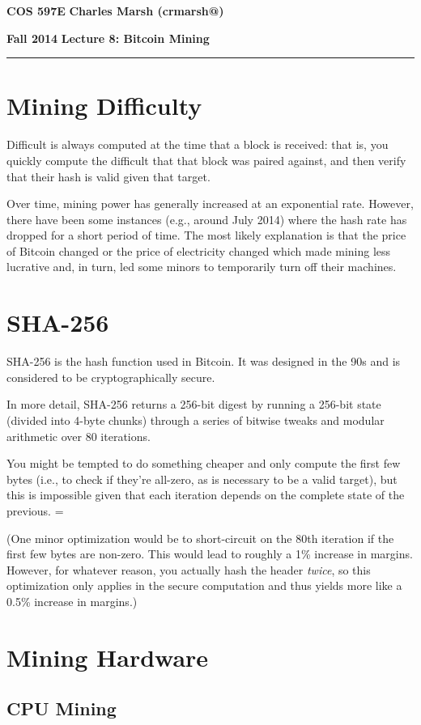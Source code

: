 \documentclass[12pt]{article}
\makeatletter
\newcommand{\myheader}[4]
{\vspace*{-0.5in}
\noindent
{#1} \hfill {#3}

\noindent
{#2} \hfill {#4}

\noindent
\rule[8pt]{\textwidth}{1pt}

\vspace{1ex} 
}  %
\newcommand{\myalgsheader}[0]
{\myheader
{ {\bf{COS 597E}} }
{ {\bf{Fall 2014}} }
{ {\bf{Charles Marsh (crmarsh@)}} }
{ {\bf{Lecture 8: Bitcoin Mining}} }
}
\makeatother
\begin{document}
\myalgsheader

\pagestyle{plain}

\section*{Mining Difficulty}

Difficult is always computed at the time that a block is received: that is, you quickly compute the difficult that that block was paired against, and then verify that their hash is valid given that target.

Over time, mining power has generally increased at an exponential rate. However, there have been some instances (e.g., around July 2014) where the hash rate has dropped for a short period of time. The most likely explanation is that the price of Bitcoin changed or the price of electricity changed which made mining less lucrative and, in turn, led some minors to temporarily turn off their machines.

\section*{SHA-256}

SHA-256 is the hash function used in Bitcoin. It was designed in the 90s and is considered to be cryptographically secure.

In more detail, SHA-256 returns a 256-bit digest by running a 256-bit state (divided into 4-byte chunks) through a series of bitwise tweaks and modular arithmetic over 80 iterations.

You might be tempted to do something cheaper and only compute the first few bytes (i.e., to check if they're all-zero, as is necessary to be a valid target), but this is impossible given that each iteration depends on the complete state of the previous. =

(One minor optimization would be to short-circuit on the 80th iteration if the first few bytes are non-zero. This would lead to roughly a 1\% increase in margins. However, for whatever reason, you actually hash the header \textit{twice}, so this optimization only applies in the secure computation and thus yields more like a 0.5\% increase in margins.)

\section*{Mining Hardware}

\subsection*{CPU Mining}
\end{document}
